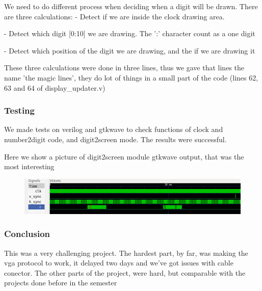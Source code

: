 We need to do different process when deciding when a digit will be drawn. There are three calculations:
- Detect if we are inside the clock drawing area.

- Detect which digit [0:10] we are drawing. The ':' character count as a one digit

- Detect which position of the digit we are drawing, and the if we are drawing it

These three calculations were done in three lines, thus we gave that lines the name 'the magic lines', they do lot of things in a small part of the code (lines 62, 63 and 64 of display_updater.v)

\subsubsection*{Testing}
We made tests on verilog and gtkwave to check functions of clock and number2digit code, and digit2screen mode. The results were successful.

Here we show a picture of digit2screen module gtkwave output, that was the most interesting

\begin{figure}[htbp]
    \begin{center}
    \includegraphics[scale=0.5]{dibujos/digit2screen.png}
    
    \end{center}
    
    \label{fig:Digit2Screen}
    \end{figure}



\subsubsection*{Conclusion}

This was a very challenging project. The hardest part, by far, was making the vga protocol to work, it delayed two days and we've got issues with cable conector. The other parts of the project, were hard, but comparable with the projects done before in the semester 





